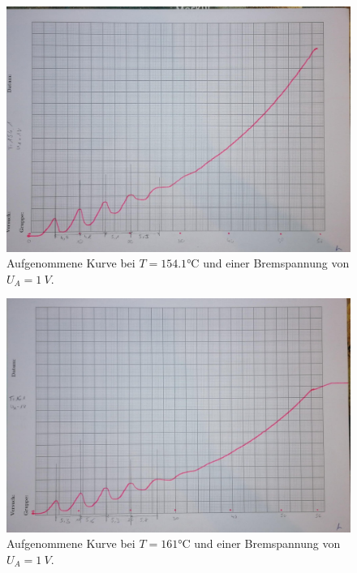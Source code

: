 \begin{figure}[H]
    \centering
    \includegraphics[scale=0.25]{content/Kurve154.jpg}
    \caption{Aufgenommene Kurve bei $T = 154.1\unit{\degreeCelsius}$ und einer Bremspannung von $U_A = \qty{1}{V}$.}
    \label{fig:154}
\end{figure}

\begin{figure}[H]
    \centering
    \includegraphics[scale=0.25]{content/Kurve161.jpg}
    \caption{Aufgenommene Kurve bei $T = 161\unit{\degreeCelsius}$ und einer Bremspannung von $U_A = \qty{1}{V}$.}
    \label{fig:161}
\end{figure}

